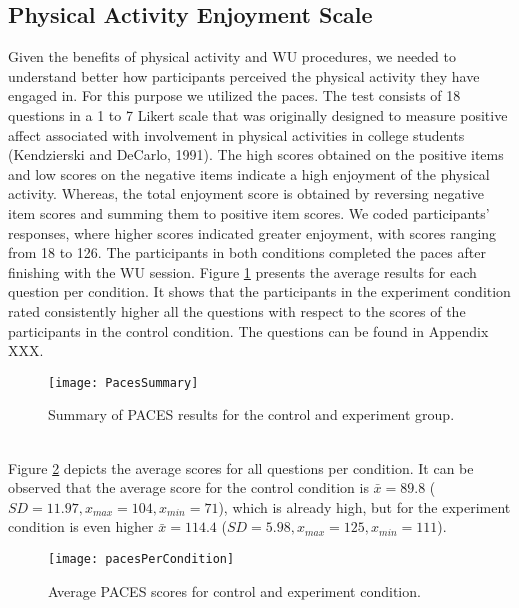 \subsection{Physical Activity Enjoyment Scale}
Given the benefits of physical activity and WU procedures, we needed to understand better how participants perceived the physical activity they have engaged in. For this purpose we utilized the \acrfull{paces}. The test consists of 18 questions in a 1 to 7 Likert scale that was originally designed to measure positive affect associated with involvement in physical activities in college students (Kendzierski and DeCarlo, 1991).  The high scores obtained on the positive items and low scores on the negative items indicate a high enjoyment of the physical activity. Whereas, the total enjoyment score is obtained by reversing negative item scores and summing them to positive item scores. We coded participants' responses, where higher scores indicated greater enjoyment, with scores ranging from 18 to 126. The participants in both conditions completed the \gls{paces} after finishing with the WU session. Figure \ref{fig:pacees} presents the average results for each question per condition. It shows that the participants in the experiment condition rated consistently higher all the questions with respect to the scores of the participants in the control condition. The questions can be found in Appendix XXX.\\
\begin{figure}[h]
    \centering
    \texttt{[image: PacesSummary]}
    \caption{Summary of PACES results for the control and experiment group.}
    \label{fig:pacees}
\end{figure}\\
Figure \ref{fig:pacesPerCondition} depicts the average scores for all questions per condition. It can be observed that the average score for the control condition is \begin{math}\bar{x} = 89.8 \end{math} (\begin{math} SD = 11.97, x_{max}= 104, x_{min}= 71\end{math}), which is already high, but for the experiment condition is even higher  \begin{math}\bar{x} = 114.4 \end{math} (\begin{math} SD = 5.98, x_{max}= 125, x_{min}= 111\end{math}).\\
\begin{figure}[h]
    \centering
    \texttt{[image: pacesPerCondition]}
    \caption{Average PACES scores for control and experiment condition.}
\label{fig:pacesPerCondition}
\end{figure}\\
